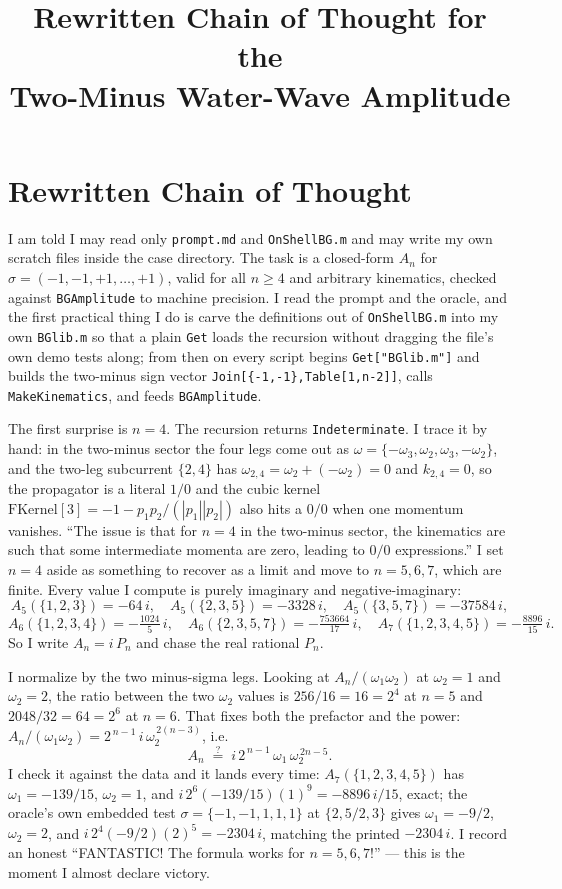 \documentclass{article}
\title{Rewritten Chain of Thought for the\\
Two-Minus Water-Wave Amplitude}
\author{}
\date{}
\begin{document}
\maketitle


\section*{Rewritten Chain of Thought}

I am told I may read only \texttt{prompt.md} and \texttt{OnShellBG.m} and may
write my own scratch files inside the case directory. The task is a closed-form
$A_n$ for $\sigma=(-1,-1,+1,\dots,+1)$, valid for all $n\ge4$ and arbitrary
kinematics, checked against \texttt{BGAmplitude} to machine precision. I read the
prompt and the oracle, and the first practical thing I do is carve the
definitions out of \texttt{OnShellBG.m} into my own \texttt{BGlib.m} so that a
plain \texttt{Get} loads the recursion without dragging the file's own demo tests
along; from then on every script begins \texttt{Get["BGlib.m"]} and builds the
two-minus sign vector \texttt{Join[\{-1,-1\},Table[1,n-2]]}, calls
\texttt{MakeKinematics}, and feeds \texttt{BGAmplitude}.

The first surprise is $n=4$. The recursion returns \texttt{Indeterminate}. I
trace it by hand: in the two-minus sector the four legs come out as
$\omega=\{-\omega_3,\omega_2,\omega_3,-\omega_2\}$, and the two-leg subcurrent
$\{2,4\}$ has $\omega_{2,4}=\omega_2+(-\omega_2)=0$ and $k_{2,4}=0$, so the
propagator is a literal $1/0$ and the cubic kernel
$\mathrm{FKernel}[3]=-1-p_1p_2/(|p_1||p_2|)$ also hits a $0/0$ when one momentum
vanishes. ``The issue is that for $n=4$ in the two-minus sector, the kinematics
are such that some intermediate momenta are zero, leading to $0/0$ expressions.''
I set $n=4$ aside as something to recover as a limit and move to $n=5,6,7$, which
are finite. Every value I compute is purely imaginary and negative-imaginary:
\[
A_5(\{1,2,3\})=-64\,i,\quad A_5(\{2,3,5\})=-3328\,i,\quad A_5(\{3,5,7\})=-37584\,i,
\]
\[
A_6(\{1,2,3,4\})=-\tfrac{1024}{5}\,i,\quad
A_6(\{2,3,5,7\})=-\tfrac{753664}{17}\,i,\quad
A_7(\{1,2,3,4,5\})=-\tfrac{8896}{15}\,i .
\]
So I write $A_n=i\,P_n$ and chase the real rational $P_n$.

I normalize by the two minus-sigma legs. Looking at $A_n/(\omega_1\omega_2)$ at
$\omega_2=1$ and $\omega_2=2$, the ratio between the two $\omega_2$ values is
$256/16=16=2^4$ at $n=5$ and $2048/32=64=2^6$ at $n=6$. That fixes both the
prefactor and the power: $A_n/(\omega_1\omega_2)=2^{\,n-1}\,i\,\omega_2^{\,2(n-3)}$,
i.e.
\[
A_n \;\stackrel{?}{=}\; i\,2^{\,n-1}\,\omega_1\,\omega_2^{\,2n-5}.
\]
I check it against the data and it lands every time:
$A_7(\{1,2,3,4,5\})$ has $\omega_1=-139/15$, $\omega_2=1$, and
$i\,2^{6}(-139/15)(1)^9=-8896\,i/15$, exact; the oracle's own embedded test
$\sigma=\{-1,-1,1,1,1\}$ at $\{2,5/2,3\}$ gives $\omega_1=-9/2$, $\omega_2=2$, and
$i\,2^4(-9/2)(2)^5=-2304\,i$, matching the printed $-2304\,i$. I record an honest
``FANTASTIC! The formula works for $n=5,6,7$!'' --- this is the moment I almost
declare victory.
\end{document}

